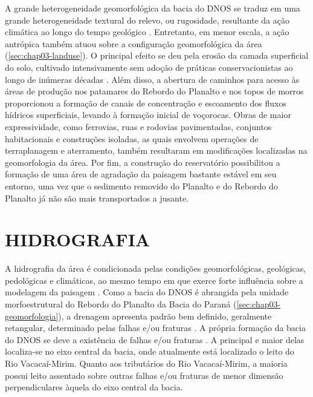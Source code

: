 A grande heterogeneidade geomorfológica da bacia do DNOS se traduz em uma grande heterogeneidade textural 
do relevo, ou rugosidade, resultante da ação climática ao longo do tempo geológico \cite{NascimentoEtAl2010}. 
Entretanto, em menor escala, a ação antrópica também atuou sobre a configuração geomorfológica da área 
(\autoref{sec:chap03-landuse}). O principal efeito se deu pela erosão da camada superficial do solo, cultivado 
intensivamente sem adoção de práticas conservacionistas ao longo de inúmeras décadas \cite{Menezes2008, 
Sturmer2008, Miguel2010, SamuelRosaEtAl2011a}. Além disso, a abertura de caminhos para acesso às áreas de 
produção nos patamares do Rebordo do Planalto e nos topos de morros proporcionou a formação de canais de 
concentração e escoamento dos fluxos hídricos superficiais, levando à formação inicial de voçorocas. Obras de 
maior expressividade, como ferrovias, ruas e rodovias pavimentadas, conjuntos habitacionais e construções 
isoladas, as quais envolvem operações de terraplanagem e aterramento, também resultaram em modificações 
localizadas na geomorfologia da área. Por fim, a construção do reservatório possibilitou a formação de uma 
área de agradação da paisagem bastante estável em seu entorno, uma vez que o sedimento removido do Planalto e 
do Rebordo do Planalto já não são mais transportados a jusante.

\section{HIDROGRAFIA}
\label{sec:chap03-hidrografia}

A hidrografia da área é condicionada pelas condições geomorfológicas, geológicas, pedológicas e climáticas, ao 
mesmo tempo em que exerce forte influência sobre a modelagem da paisagem \cite{NascimentoEtAl2010}. Como a 
bacia do DNOS é abrangida pela unidade morfoestrutural do Rebordo do Planalto da Bacia do Paraná 
(\autoref{sec:chap03-geomorfologia}), a drenagem apresenta padrão bem definido, geralmente retangular, 
determinado pelas falhas e/ou fraturas \cite{Bortoluzzi1974, GasparettoEtAl1988, NascimentoEtAl2010}. A 
própria formação da bacia do DNOS se deve a existência de falhas e/ou fraturas \cite{GasparettoEtAl1988}. A 
principal e maior delas localiza-se no eixo central da bacia, onde atualmente está localizado o leito do Rio 
Vacacaí-Mirim. Quanto aos tributários do Rio Vacacaí-Mirim, a maioria possui leito assentado sobre outras 
falhas e/ou fraturas de menor dimensão perpendiculares àquela do eixo central da bacia.

